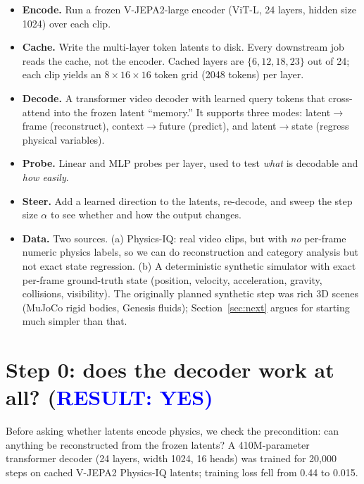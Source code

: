 \documentclass{article} %
\newcommand{\vjepa}{V-JEPA2}
\newcommand{\alphanorm}{\ensuremath{\alpha}}        %
\begin{document}
\begin{itemize}
\item \textbf{Encode.} Run a frozen \vjepa{}-large encoder (ViT-L, 24 layers, hidden size 1024) over each clip.
\item \textbf{Cache.} Write the multi-layer token latents to disk.  Every downstream job reads the cache, not the encoder. Cached layers
are $\{6,12,18,23\}$ out of 24; each clip yields an $8\times16\times16$ token grid (2048 tokens) per
layer.
\item \textbf{Decode.} A transformer video decoder with learned query tokens that cross-attend into
the frozen latent ``memory.'' It supports three modes: latent$\rightarrow$frame (reconstruct),
context$\rightarrow$future (predict), and latent$\rightarrow$state (regress physical variables).
\item \textbf{Probe.} Linear and MLP probes per layer, used to test \emph{what} is decodable and
\emph{how easily}.
\item \textbf{Steer.} Add a learned direction to the latents, re-decode, and sweep the step size
\alphanorm{} to see whether and how the output changes.
\item \textbf{Data.} Two sources. (a) Physics-IQ: real video clips, but with \emph{no} per-frame
numeric physics labels, so we can do reconstruction and category analysis but not exact state
regression. (b) A deterministic synthetic simulator with exact per-frame ground-truth state (position,
velocity, acceleration, gravity, collisions, visibility). The originally planned synthetic step was
rich 3D scenes (MuJoCo rigid bodies, Genesis fluids); Section~\ref{sec:next} argues for starting much
simpler than that.
\end{itemize}

\section{Step 0: does the decoder work at all? (\textcolor{blue}{RESULT: YES)}}
\label{sec:step0}

Before asking whether latents encode physics, we check the precondition: can anything be reconstructed
from the frozen latents? A 410M-parameter transformer decoder (24 layers, width 1024, 16 heads) was
trained for 20{,}000 steps on cached \vjepa{} Physics-IQ latents; training loss fell from 0.44 to
0.015.
\end{document}
